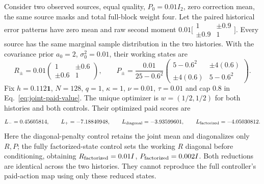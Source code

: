 \begin{proposition}
\label{prop:joint-pairing-paid-action}
Consider two observed sources, equal quality, $P_0=0.01I_2$, zero correction
mean, the same source masks and total full-block weight four. Let the paired
historical error patterns have zero mean and raw second moment
$0.01\bigl[\begin{smallmatrix}1&\pm0.9\\\pm0.9&1\end{smallmatrix}\bigr]$.
Every source has the same marginal sample distribution in the two histories.
With the covariance prior $a_0=2$, $\sigma_0^2=0.01$, their working states are
\begin{equation}
 R_\pm=0.01
 \begin{pmatrix}1&\pm0.6\\\pm0.6&1\end{pmatrix},\qquad
 P_\pm=\frac{0.01}{25-0.6^2}
 \begin{pmatrix}5-0.6^2&\pm4(0.6)\\\pm4(0.6)&5-0.6^2\end{pmatrix}.
 \label{eq:paired-history-working-states}
\end{equation}
Fix $h=0.112\mathbf1$, $N=128$, $q=1$, $\kappa=1$, $\nu=0.01$,
$\tau=0.01$ and cap $0.8$ in Eq.~\eqref{eq:joint-paid-value}.
The unique optimizer is $w=(1/2,1/2)$ for both histories and both controls.
Their optimized paid scores are
\begin{equation}
 L_- =0.45605814,\qquad L_+=-7.18840948,\qquad
 L_{\rm diagonal}=-3.93599601,\qquad
 L_{\rm factorized}=-4.05030812.
 \label{eq:paired-history-paid-scores}
\end{equation}
Here the diagonal-penalty control retains the joint mean and diagonalizes
only $R,P$; the fully factorized-state control sets the working $R$ diagonal
before conditioning, obtaining $R_{\rm factorized}=0.01I$,
$P_{\rm factorized}=0.002I$. Both reductions are identical across the two
histories. They cannot reproduce the full controller's paid-action map using
only these reduced states.
\end{proposition}
